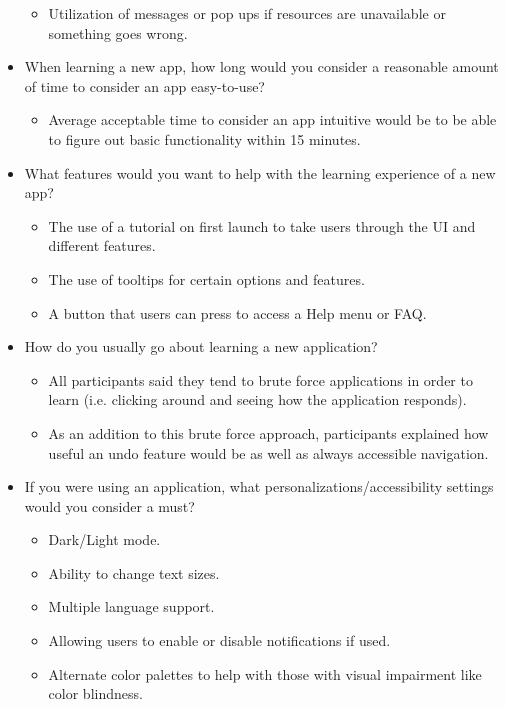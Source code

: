 \documentclass[12pt]{article}
\begin{document}
\begin{itemize}
\begin{itemize}
      \item Utilization of messages or pop ups if resources are unavailable or something goes wrong.
    \end{itemize}
  \item When learning a new app, how long would you consider a reasonable amount of time
  to consider an app easy-to-use?
    \begin{itemize}
      \item Average acceptable time to consider an app intuitive would be to be able to figure
      out basic functionality within 15 minutes.
    \end{itemize}
  \item What features would you want to help with the learning experience of a new app?
    \begin{itemize}
      \item The use of a tutorial on first launch to take users through the UI and different features.
      \item The use of tooltips for certain options and features.
      \item A button that users can press to access a Help menu or FAQ.
    \end{itemize}
  \item How do you usually go about learning a new application?
    \begin{itemize}
      \item All participants said they tend to brute force applications in order to learn
      (i.e. clicking around and seeing how the application responds).
      \item As an addition to this brute force approach, participants explained how useful an
      undo feature would be as well as always accessible navigation.
    \end{itemize}
  \item If you were using an application, what personalizations/accessibility settings
  would you consider a must?
    \begin{itemize}
      \item Dark/Light mode.
      \item Ability to  change text sizes.
      \item Multiple language support.
      \item Allowing users to enable or disable notifications if used.
      \item Alternate color palettes to help with those with visual impairment like color blindness.
    \end{itemize}

\end{itemize}
\end{document}
